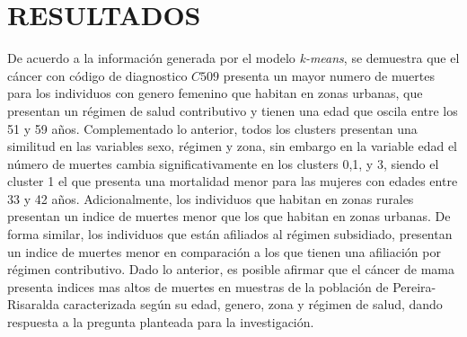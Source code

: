 \section{RESULTADOS}

De acuerdo a la información generada por el modelo \textit{k-means}, se demuestra que el cáncer con código de diagnostico $C509$  presenta un mayor numero de muertes para los individuos con genero femenino que habitan en zonas urbanas, que presentan un régimen de salud contributivo y tienen una edad que oscila entre los 51 y 59 años. Complementado lo anterior, todos los clusters presentan una similitud en las variables sexo, régimen y zona, sin embargo en la variable edad el número de muertes cambia significativamente en los clusters 0,1, y 3, siendo el cluster 1 el que presenta una mortalidad menor para las mujeres con edades entre 33 y 42 años. Adicionalmente, los individuos que habitan en zonas rurales presentan un indice de muertes menor que los que habitan en zonas urbanas. De forma similar, los individuos que están afiliados al régimen subsidiado, presentan un indice de muertes menor en comparación a los que tienen una afiliación por régimen contributivo. Dado lo anterior, es posible afirmar que el cáncer de mama presenta indices mas altos de muertes en muestras de la población de Pereira-Risaralda caracterizada según su edad, genero, zona y régimen de salud, dando respuesta a la pregunta planteada para la investigación.

